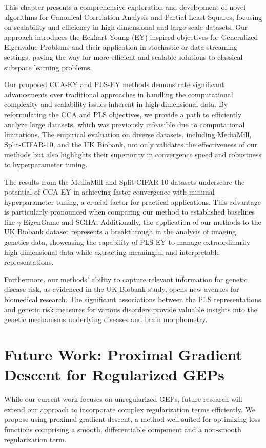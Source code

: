This chapter presents a comprehensive exploration and development of novel algorithms for Canonical Correlation Analysis and Partial Least Squares, focusing on scalability and efficiency in high-dimensional and large-scale datasets.
Our approach introduces the Eckhart-Young (EY) inspired objectives for Generalized Eigenvalue Problems and their application in stochastic or data-streaming settings, paving the way for more efficient and scalable solutions to classical subspace learning problems.

Our proposed CCA-EY and PLS-EY methods demonstrate significant advancements over traditional approaches in handling the computational complexity and scalability issues inherent in high-dimensional data.
By reformulating the CCA and PLS objectives, we provide a path to efficiently analyze large datasets, which was previously infeasible due to computational limitations.
The empirical evaluation on diverse datasets, including MediaMill, Split-CIFAR-10, and the UK Biobank, not only validates the effectiveness of our methods but also highlights their superiority in convergence speed and robustness to hyperparameter tuning.

The results from the MediaMill and Split-CIFAR-10 datasets underscore the potential of CCA-EY in achieving faster convergence with minimal hyperparameter tuning, a crucial factor for practical applications.
This advantage is particularly pronounced when comparing our method to established baselines like $\gamma$-EigenGame and SGHA. Additionally, the application of our methods to the UK Biobank dataset represents a breakthrough in the analysis of imaging genetics data, showcasing the capability of PLS-EY to manage extraordinarily high-dimensional data while extracting meaningful and interpretable representations.

Furthermore, our methods' ability to capture relevant information for genetic disease risk, as evidenced in the UK Biobank study, opens new avenues for biomedical research.
The significant associations between the PLS representations and genetic risk measures for various disorders provide valuable insights into the genetic mechanisms underlying diseases and brain morphometry.

\section{Future Work: Proximal Gradient Descent for Regularized GEPs}

While our current work focuses on unregularized GEPs, future research will extend our approach to incorporate complex regularization terms efficiently. We propose using proximal gradient descent, a method well-suited for optimizing loss functions comprising a smooth, differentiable component and a non-smooth regularization term.

